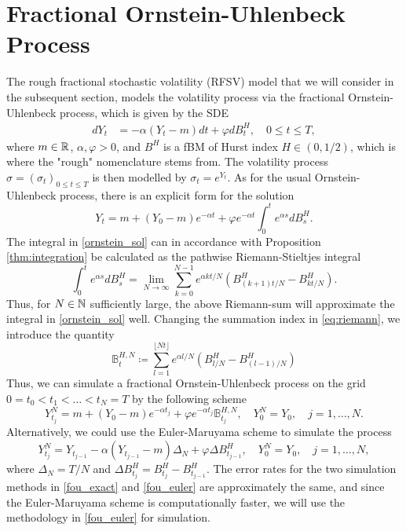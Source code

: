 \section{Fractional Ornstein-Uhlenbeck Process}
The rough fractional stochastic volatility (RFSV) model that we will consider in the subsequent section, models the volatility process via the fractional Ornstein-Uhlenbeck process, which is given by the SDE
\begin{align}
    dY_{t}&= -\alpha(Y_{t}-m)dt + \varphi dB^{H}_{t},\quad 0\leq t\leq T,
\end{align}
where $m \in \mathbb{R}$, $\alpha,\varphi >0$, and $B^{H}$ is a fBM of Hurst index $H\in(0,1/2)$, which is where the "rough" nomenclature stems from. The volatility process $\sigma = (\sigma_{t})_{0\leq t\leq T}$ is then modelled by $\sigma_{t}= e^{Y_{t}}$. As for the usual Ornstein-Uhlenbeck process, there is an explicit form for the solution
\begin{equation}\label{ornstein_sol}
    Y_{t}= m + (Y_{0}-m)e^{-\alpha t} + \varphi e^{-\alpha t}\int_{0}^{t}e^{\alpha s}dB_{s}^{H}.
\end{equation}
The integral in \eqref{ornstein_sol} can in accordance with Proposition \ref{thm:integration} be calculated as the pathwise Riemann-Stieltjes integral
\begin{equation}\label{eq:riemann}
    \int_{0}^{t}e^{\alpha s}dB_{s}^{H}=\lim_{N\to\infty}\sum_{k=0}^{N-1}e^{\alpha k t/N}\left(B_{(k+1)t/N}^{H}-B_{kt/N}^{H}\right).
\end{equation}
Thus, for $N\in\mathbb{N}$ sufficiently large, the above Riemann-sum will approximate the integral in \eqref{ornstein_sol} well. Changing the summation index in \eqref{eq:riemann}, we introduce the quantity
\begin{equation}
    \mathbb{B}_{t}^{H,N}\coloneqq \sum_{l=1}^{\lfloor Nt\rfloor }e^{\alpha l/N}\left(B^{H}_{l/N}-B^{H}_{(l-1)/N}\right)
\end{equation}
Thus, we can simulate a fractional Ornstein-Uhlenbeck process on the grid $0=t_{0}<t_{1}<\dots<t_{N}=T$ by the following scheme
\begin{equation}\label{fou_exact}
    Y_{t_{j}}^{N}=m + (Y_{0}-m)e^{-\alpha t_{j}} + \varphi e^{-\alpha t_{j}}\mathbb{B}_{t_{j}}^{H,N},\quad Y_{0}^{N}=Y_{0}, \quad j=1,\dots,N.
\end{equation}
Alternatively, we could use the Euler-Maruyama scheme to simulate the process
\begin{equation}\label{fou_euler}
    Y_{t_{j}}^{N}=Y_{t_{j-1}} -\alpha(Y_{t_{j-1}}-m)\Delta_{N} + \varphi\Delta B_{t_{j-1}}^{H},\quad Y_{0}^{N}=Y_{0},\quad j=1,\dots,N,
\end{equation}
where $\Delta_{N}=T/N$ and $\Delta B_{t_{j}}^{H}=B^{H}_{t_{j}}-B^{H}_{t_{j-1}}$. The error rates for the two simulation methods in \eqref{fou_exact} and \eqref{fou_euler} are approximately the same, and since the Euler-Maruyama scheme is computationally faster, we will use the methodology in \eqref{fou_euler} for simulation.

